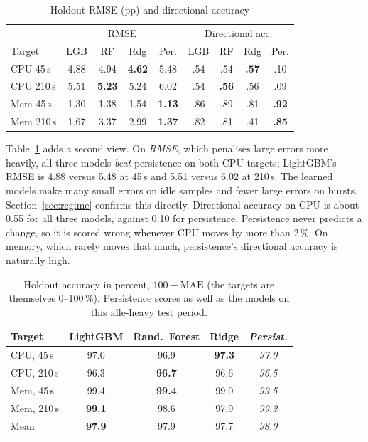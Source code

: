 \documentclass[conference]{IEEEtran}
\begin{document}
\begin{table}[t]
\centering
\caption{Holdout RMSE (pp) and directional accuracy}
\label{tab:rmse}
\footnotesize\setlength{\tabcolsep}{3pt}
\begin{tabular}{@{}l|cccc|cccc@{}}
\toprule
& \multicolumn{4}{c|}{RMSE} & \multicolumn{4}{c}{Directional acc.} \\
Target & LGB & RF & Rdg & Per. & LGB & RF & Rdg & Per. \\
\midrule
CPU 45\,s  & 4.88 & 4.94 & \textbf{4.62} & 5.48 & .54 & .54 & \textbf{.57} & .10 \\
CPU 210\,s & 5.51 & \textbf{5.23} & 5.24 & 6.02 & .54 & \textbf{.56} & .56 & .09 \\
Mem 45\,s  & 1.30 & 1.38 & 1.54 & \textbf{1.13} & .86 & .89 & .81 & \textbf{.92} \\
Mem 210\,s & 1.67 & 3.37 & 2.99 & \textbf{1.37} & .82 & .81 & .41 & \textbf{.85} \\
\bottomrule
\end{tabular}
\end{table}

Table~\ref{tab:rmse} adds a second view. On \emph{RMSE}, which penalises
large errors more heavily, all three models \emph{beat} persistence on both
CPU targets; LightGBM's RMSE is 4.88 versus 5.48 at 45\,s and 5.51 versus
6.02 at 210\,s. The learned models make many small errors on idle samples and
fewer large errors on bursts. Section~\ref{sec:regime} confirms this directly.
Directional accuracy on CPU is about 0.55 for all three models, against 0.10
for persistence. Persistence never predicts a change, so it is scored wrong
whenever CPU moves by more than 2\,\%. On memory, which rarely moves that much,
persistence's directional accuracy is naturally high.

\begin{table}[t]
\centering
\caption{Holdout accuracy in percent, $100 - \mathrm{MAE}$ (the targets are
themselves 0--100\,\%). Persistence scores as well as the models on this
idle-heavy test period.}
\label{tab:accpct}
\begin{tabular}{@{}lcccc@{}}
\toprule
Target & LightGBM & Rand.\ Forest & Ridge & \textit{Persist.} \\
\midrule
CPU, 45\,s   & 97.0 & 96.9 & \textbf{97.3} & \textit{97.0} \\
CPU, 210\,s  & 96.3 & \textbf{96.7} & 96.6 & \textit{96.5} \\
Mem, 45\,s   & 99.4 & \textbf{99.4} & 99.0 & \textit{99.5} \\
Mem, 210\,s  & \textbf{99.1} & 98.6 & 97.9 & \textit{99.2} \\
\midrule
Mean         & \textbf{97.9} & 97.9 & 97.7 & \textit{98.0} \\
\bottomrule
\end{tabular}
\end{table}
\end{document}
